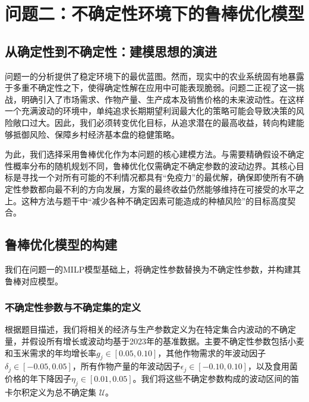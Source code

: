 \documentclass[withoutpreface,bwprint]{cumcmthesis} %
\begin{document}








\section{问题二：不确定性环境下的鲁棒优化模型}

\subsection{从确定性到不确定性：建模思想的演进}

问题一的分析提供了稳定环境下的最优蓝图。然而，现实中的农业系统固有地暴露于多重不确定性之下，使得确定性解在应用中可能表现脆弱。问题二正视了这一挑战，明确引入了市场需求、作物产量、生产成本及销售价格的未来波动性。在这样一个充满波动的环境中，单纯追求长期期望利润最大化的策略可能会导致决策的风险敞口过大。因此，我们必须转变优化目标，从追求潜在的最高收益，转向构建能够抵御风险、保障乡村经济基本盘的稳健策略。

为此，我们选择采用鲁棒优化作为本问题的核心建模方法。与需要精确假设不确定性概率分布的随机规划不同，鲁棒优化仅需确定不确定参数的波动边界。其核心目标是寻找一个对所有可能的不利情况都具有“免疫力”的最优解，确保即使所有不确定性参数都向最不利的方向发展，方案的最终收益仍然能够维持在可接受的水平之上。这种方法与题干中“减少各种不确定因素可能造成的种植风险”的目标高度契合。

\subsection{鲁棒优化模型的构建}

我们在问题一的MILP模型基础上，将确定性参数替换为不确定性参数，并构建其鲁棒对应模型。

\subsubsection{不确定性参数与不确定集的定义}

根据题目描述，我们将相关的经济与生产参数定义为在特定集合内波动的不确定量，并假设所有增长或波动均基于2023年的基准数据。主要不确定性参数包括小麦和玉米需求的年均增长率$g_j \in [0.05, 0.10]$，其他作物需求的年波动因子$\delta_j \in [-0.05, 0.05]$，所有作物产量的年波动因子$\epsilon_j \in [-0.10, 0.10]$，以及食用菌价格的年下降因子$\eta_j \in [0.01, 0.05]$。我们将这些不确定参数构成的波动区间的笛卡尔积定义为总不确定集 $\mathcal{U}$。
\end{document}
